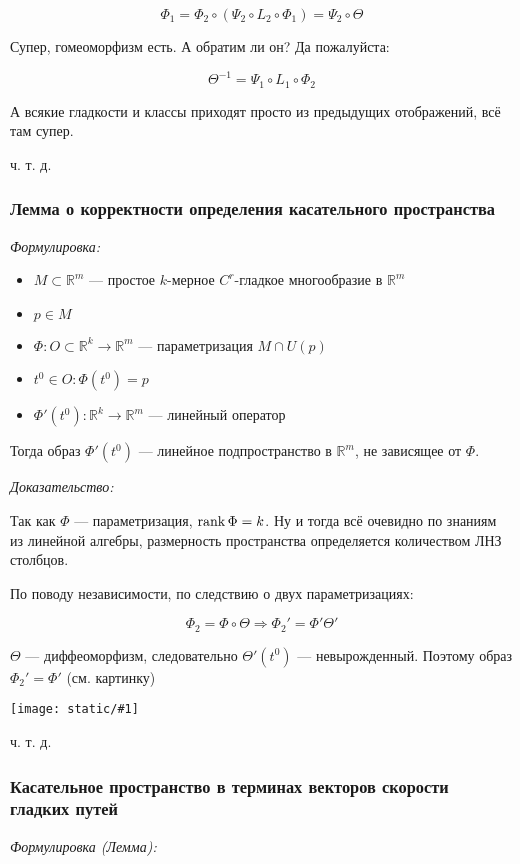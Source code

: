 \documentclass{article}
\def\image#1{\texttt{[image: static/\#1]}}
\begin{document}
\[\Phi_1 = \Phi_2 \circ (\Psi_2 \circ L_2 \circ \Phi_1) = \Psi_2 \circ \Theta\]

Супер, гомеоморфизм есть. А обратим ли он? Да пожалуйста:

\[\Theta^{-1} = \Psi_1 \circ L_1 \circ \Phi_2\]

А всякие гладкости и классы приходят просто из предыдущих отображений, всё там супер.

ч. т. д.

\subsubsection{Лемма о корректности определения касательного пространства}
\textit{Формулировка:}

\begin{itemize}
    \item $M \subset \mathbb{R}^m$ --- простое $k$-мерное $C^r$-гладкое многообразие в $\mathbb{R}^m$
    \item $p \in M$
    \item $\Phi: O \subset \mathbb{R}^k \rightarrow \mathbb{R}^m$ --- параметризация $M \cap U(p)$
    \item $t^0 \in O: \Phi(t^0) = p$
    \item $\Phi'(t^0): \mathbb{R}^k \rightarrow \mathbb{R}^m$ --- линейный оператор
\end{itemize}

Тогда образ $\Phi'(t^0)$ --- линейное подпространство в $\mathbb{R}^m$, не зависящее от $\Phi$.

\textit{Доказательство:}

Так как $\Phi$ --- параметризация, $\rank \Phi = k$. Ну и тогда всё очевидно по знаниям из линейной алгебры, размерность пространства определяется количеством ЛНЗ столбцов.

По поводу независимости, по следствию о двух параметризациях:

\[\Phi_2 = \Phi \circ \Theta \Rightarrow \Phi_2' = \Phi' \Theta'\]

$\Theta$ --- диффеоморфизм, следовательно $\Theta'(t^0)$ --- невырожденный. Поэтому образ $\Phi_2' = \Phi'$ (см. картинку)

\image{lemm_corr_par.png}

ч. т. д.

\subsubsection{Касательное пространство в терминах векторов скорости гладких путей}
\textit{Формулировка (Лемма):}
\end{document}
